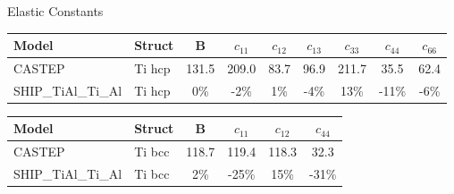 \documentclass[preview]{standalone}
\begin{document}
\begin{center}
\textnormal{Elastic Constants} \\
\vspace{2mm}
\begin{tabular}{ l l c c c c c c c } \toprule 
Model & Struct & B & $c_{11}$ & $c_{12}$ & $c_{13}$ & $c_{33}$ & $c_{44}$ & $c_{66}$\\ \midrule 
CASTEP & Ti hcp & 131.5 & 209.0 & 83.7 & 96.9 & 211.7 & 35.5 & 62.4\\ 
SHIP\_TiAl\_Ti\_Al & Ti hcp & 0\% & -2\% & 1\% & -4\% & 13\% & -11\% & -6\%\\ 
\end{tabular} \bigskip \begin{tabular}{ l l c c c c } \toprule 
Model & Struct & B & $c_{11}$ & $c_{12}$ & $c_{44}$\\ \midrule 
CASTEP & Ti bcc & 118.7 & 119.4 & 118.3 & 32.3\\ 
SHIP\_TiAl\_Ti\_Al & Ti bcc & 2\% & -25\% & 15\% & -31\%\\ 
\end{tabular} \bigskip 
\end{center}
\end{document}
